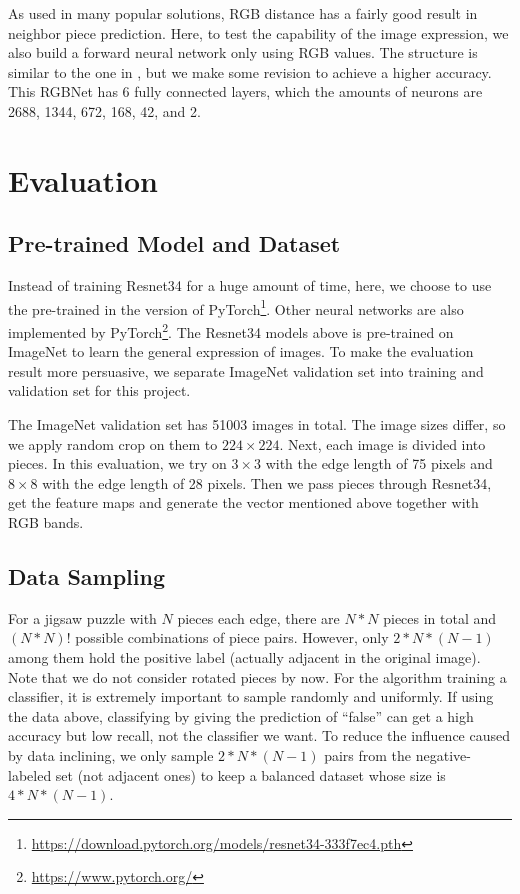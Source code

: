 \documentclass{article}
\begin{document}
As used in many popular solutions, RGB distance has a fairly good result in neighbor piece prediction. Here, to test the capability of the image expression, we also build a forward neural network only using RGB values. The structure is similar to the one in \cite{sholomon2016dnn}, but we make some revision to achieve a higher accuracy. This RGBNet has 6 fully connected layers, which the amounts of neurons are 2688, 1344, 672, 168, 42, and 2.

\section{Evaluation}

\subsection{Pre-trained Model and Dataset}

Instead of training Resnet34 for a huge amount of time, here, we choose to use the pre-trained in the version of PyTorch\footnote{\url{https://download.pytorch.org/models/resnet34-333f7ec4.pth}}. Other neural networks are also implemented by PyTorch\footnote{\url{https://www.pytorch.org/}}. The Resnet34 models above is pre-trained on ImageNet\cite{krizhevsky2012imagenet} to learn the general expression of images. To make the evaluation result more persuasive, we separate ImageNet validation set into training and validation set for this project.

The ImageNet validation set has 51003 images in total. The image sizes differ, so we apply random crop on them to $224\times224$. Next, each image is divided into pieces. In this evaluation, we try on $3\times3$ with the edge length of 75 pixels and $8\times8$ with the edge length of 28 pixels. Then we pass pieces through Resnet34, get the feature maps and generate the vector mentioned above together with RGB bands.

\subsection{Data Sampling}

For a jigsaw puzzle with $N$ pieces each edge, there are $N*N$ pieces in total and $(N*N)!$ possible combinations of piece pairs. However, only $2*N*(N-1)$ among them hold the positive label (actually adjacent in the original image). Note that we do not consider rotated pieces by now. For the algorithm training a classifier, it is extremely important to sample randomly and uniformly. If using the data above, classifying by giving the prediction of ``false'' can get a high accuracy but low recall, not the classifier we want. To reduce the influence caused by data inclining, we only sample $2*N*(N-1)$ pairs from the negative-labeled set (not adjacent ones) to keep a balanced dataset whose size is $4*N*(N-1)$.
\end{document}

